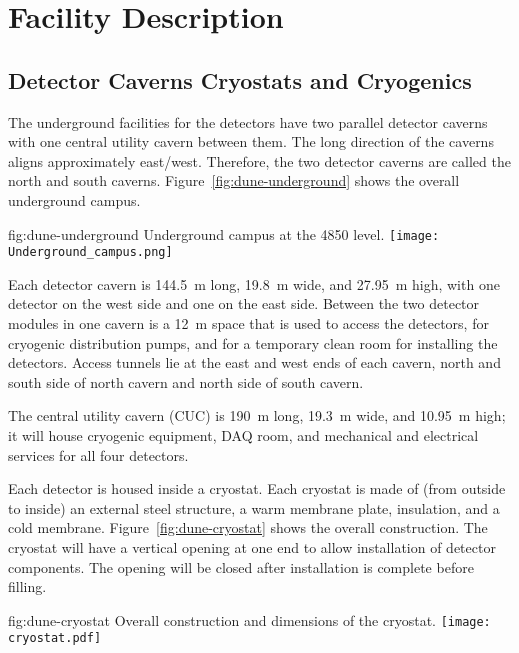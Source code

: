 ﻿\chapter{Facility Description}
\label{vl:tc-facility}


\section{Detector Caverns Cryostats and Cryogenics}
\label{sec:fdsp-coord-faci-caverns}


The underground facilities for the detectors have two parallel
detector caverns with one central utility cavern between them. The long
direction of the caverns aligns approximately east/west. Therefore, the two detector caverns are called the north and
south caverns. Figure~\ref{fig:dune-underground} shows the overall
underground campus.
\begin{dunefigure}{fig:dune-underground}
  {Underground campus at the 4850 level.}
  \texttt{[image: Underground\_campus.png]}
\end{dunefigure}


Each detector cavern is \SI{144.5}{\meter} long, \SI{19.8}{\meter}
wide, and \SI{27.95}{\meter} high, with
one detector on the west side and one on the east side. Between the two
detector modules in one cavern is a \SI{12}{\meter} space that
is used to access the detectors, for cryogenic distribution pumps,
and for a temporary clean room for installing the detectors. Access tunnels lie at the east and west ends of each cavern, north and south side of north cavern and north side of south cavern.


The central utility cavern (CUC) is \SI{190}{\meter} long, \SI{19.3}{\meter}
wide, and \SI{10.95}{\meter} high; it will house cryogenic equipment, DAQ
room, and mechanical and electrical services for all four
detectors.


Each detector is housed inside a cryostat. Each cryostat is made of (from
outside to inside) an external steel structure, a warm membrane
plate, insulation, and a cold membrane. Figure~\ref{fig:dune-cryostat}
shows the overall construction. The cryostat will have a vertical
opening at one end to allow installation of detector
components. The opening will be closed after installation is complete before filling.
\begin{dunefigure}{fig:dune-cryostat}
  {Overall construction and dimensions of the  cryostat.}
  \texttt{[image: cryostat.pdf]}
\end{dunefigure}


